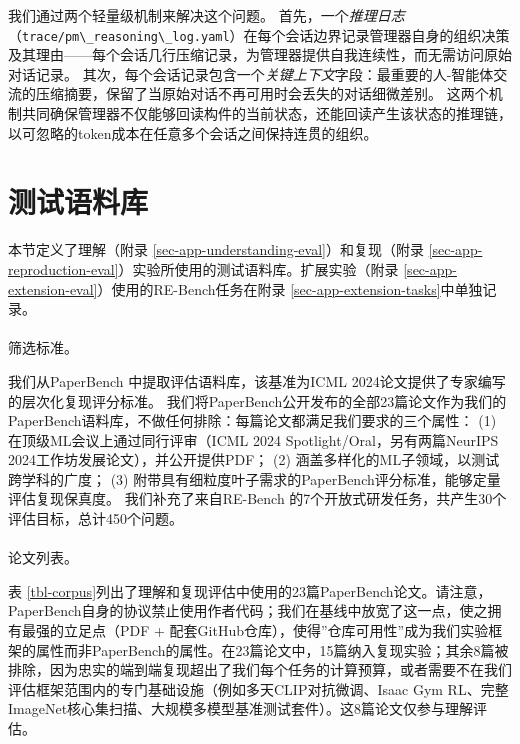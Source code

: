\documentclass[
]{article}
\makeatletter
\let\oldparagraph\paragraph
\renewcommand{\paragraph}{
    \@ifstar
      \xxxParagraphStar
      \xxxParagraphNoStar
  }
\newcommand{\xxxParagraphStar}[1]{\oldparagraph*{#1}\mbox{}}
\newcommand{\xxxParagraphNoStar}[1]{\oldparagraph{#1}\mbox{}}
\newcommand{\passthrough}[1]{#1}
\theoremstyle{definition}
\makeatother
\begin{document}
我们通过两个轻量级机制来解决这个问题。
首先，一个\emph{推理日志}（\passthrough{\lstinline!trace/pm\_reasoning\_log.yaml!}）在每个会话边界记录管理器自身的组织决策及其理由------每个会话几行压缩记录，为管理器提供自我连续性，而无需访问原始对话记录。
其次，每个会话记录包含一个\emph{关键上下文}字段：最重要的人-智能体交流的压缩摘要，保留了当原始对话不再可用时会丢失的对话细微差别。
这两个机制共同确保管理器不仅能够回读构件的当前状态，还能回读产生该状态的推理链，以可忽略的token成本在任意多个会话之间保持连贯的组织。

\section{测试语料库}\label{sec-app-eval-details}

本节定义了理解（附录 \ref{sec-app-understanding-eval}）和复现（附录
\ref{sec-app-reproduction-eval}）实验所使用的测试语料库。扩展实验（附录
\ref{sec-app-extension-eval}）使用的RE-Bench任务在附录
\ref{sec-app-extension-tasks}中单独记录。

\paragraph{筛选标准。}\label{ux7b5bux9009ux6807ux51c6}

我们从PaperBench
\citep{starace2025paperbench}中提取评估语料库，该基准为ICML
2024论文提供了专家编写的层次化复现评分标准。
我们将PaperBench公开发布的全部23篇论文作为我们的PaperBench语料库，不做任何排除：每篇论文都满足我们要求的三个属性：
(1) 在顶级ML会议上通过同行评审（ICML 2024
Spotlight/Oral，另有两篇NeurIPS 2024工作坊发展论文），并公开提供PDF；
(2) 涵盖多样化的ML子领域，以测试跨学科的广度； (3)
附带具有细粒度叶子需求的PaperBench评分标准，能够定量评估复现保真度。
我们补充了来自RE-Bench
\citep{wijk2025rebench}的7个开放式研发任务，共产生30个评估目标，总计450个问题。

\paragraph{论文列表。}\label{ux8bbaux6587ux5217ux8868}

表
\ref{tbl-corpus}列出了理解和复现评估中使用的23篇PaperBench论文。请注意，PaperBench自身的协议禁止使用作者代码；我们在基线中放宽了这一点，使之拥有最强的立足点（PDF
+
配套GitHub仓库），使得''仓库可用性''成为我们实验框架的属性而非PaperBench的属性。在23篇论文中，15篇纳入复现实验；其余8篇被排除，因为忠实的端到端复现超出了我们每个任务的计算预算，或者需要不在我们评估框架范围内的专门基础设施（例如多天CLIP对抗微调、Isaac
Gym
RL、完整ImageNet核心集扫描、大规模多模型基准测试套件）。这8篇论文仅参与理解评估。
\end{document}
